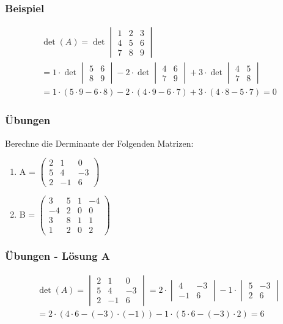 \begin{frame}
	\frametitle{Beispiel}
	\begin{gather*}
	\det(A) = \det\begin{vmatrix}
	1 & 2 & 3 \\
	4 & 5 & 6 \\
	7 & 8 & 9
	\end{vmatrix} \\
	= 1 \cdot \det\begin{vmatrix}
	5 & 6 \\
	8 & 9
	\end{vmatrix} - 2 \cdot \det\begin{vmatrix}
	4 & 6 \\
	7 & 9
	\end{vmatrix} + 3 \cdot \det\begin{vmatrix}
	4 & 5 \\
	7 & 8
	\end{vmatrix}\\
	= 1 \cdot (5 \cdot 9 - 6 \cdot 8) - 2 \cdot (4 \cdot 9 - 6 \cdot 7) + 3 \cdot (4 \cdot 8 - 5 \cdot 7) = 0
	\end{gather*}
\end{frame}


\begin{frame}
	\frametitle{Übungen}
	Berechne die Derminante der Folgenden Matrizen:
	\begin{enumerate}
	\item A = $\begin{pmatrix}
		2 & 1 & 0 \\
		5 & 4 & -3 \\
		2 & -1 & 6
		\end{pmatrix}$
	\item B = $\begin{pmatrix}
		3 & 5 & 1 & -4 \\
		-4 & 2 & 0 & 0 \\
		3 & 8 & 1 & 1 \\
		1 & 2 & 0 & 2
		\end{pmatrix}$
		\end{enumerate}
\end{frame}

\begin{frame}
	\frametitle{Übungen - Lösung A}
	\begin{gather*}
	 \det(A) = \begin{vmatrix}
		2 & 1 & 0 \\
		5 & 4 & -3 \\
		2 & -1 & 6
		\end{vmatrix} 
		= 2 \cdot \begin{vmatrix}
		4 & -3 \\
		-1 & 6
		\end{vmatrix} - 1 \cdot \begin{vmatrix}
		5 & -3 \\
		2 & 6
		\end{vmatrix}\\
		= 2 \cdot (4 \cdot 6 - (-3) \cdot (-1)) - 1 \cdot (5 \cdot 6 - (-3) \cdot 2) = 6
	\end{gather*}
\end{frame}

